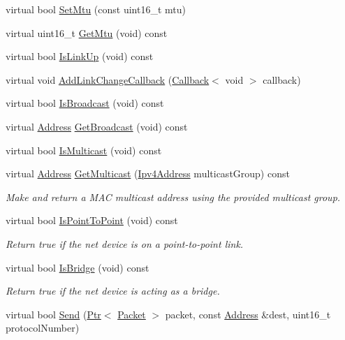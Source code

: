 \begin{DoxyCompactItemize}
\item 
virtual bool \hyperlink{classns3_1_1FdNetDevice_a7f1ac465e2a943f0369c99bd3525bb00}{Set\+Mtu} (const uint16\+\_\+t mtu)
\item 
virtual uint16\+\_\+t \hyperlink{classns3_1_1FdNetDevice_ac1d86a7d43dc3c27bccb8e06b6779f6c}{Get\+Mtu} (void) const 
\item 
virtual bool \hyperlink{classns3_1_1FdNetDevice_afe7a9225c43079850621ff0af3dc50c9}{Is\+Link\+Up} (void) const 
\item 
virtual void \hyperlink{classns3_1_1FdNetDevice_a997b2f4def41dafb904ccdb11b19b51d}{Add\+Link\+Change\+Callback} (\hyperlink{classns3_1_1Callback}{Callback}$<$ void $>$ callback)
\item 
virtual bool \hyperlink{classns3_1_1FdNetDevice_a0d582586009e076369fc8dc60f125452}{Is\+Broadcast} (void) const 
\item 
virtual \hyperlink{classns3_1_1Address}{Address} \hyperlink{classns3_1_1FdNetDevice_ada7d26e95bb6f320bacb1677c75f7484}{Get\+Broadcast} (void) const 
\item 
virtual bool \hyperlink{classns3_1_1FdNetDevice_aa0ab9a8b2aa654ac8462721081548e83}{Is\+Multicast} (void) const 
\item 
virtual \hyperlink{classns3_1_1Address}{Address} \hyperlink{classns3_1_1FdNetDevice_ac717e2565f3ca7ea35ff4ac0d05e9e78}{Get\+Multicast} (\hyperlink{classns3_1_1Ipv4Address}{Ipv4\+Address} multicast\+Group) const 
\begin{DoxyCompactList}\small\item\em Make and return a M\+AC multicast address using the provided multicast group. \end{DoxyCompactList}\item 
virtual bool \hyperlink{classns3_1_1FdNetDevice_adc2e71a7a047107567676d5fd604016f}{Is\+Point\+To\+Point} (void) const 
\begin{DoxyCompactList}\small\item\em Return true if the net device is on a point-\/to-\/point link. \end{DoxyCompactList}\item 
virtual bool \hyperlink{classns3_1_1FdNetDevice_a23c9c76044490449abd1ec8f1d500072}{Is\+Bridge} (void) const 
\begin{DoxyCompactList}\small\item\em Return true if the net device is acting as a bridge. \end{DoxyCompactList}\item 
virtual bool \hyperlink{classns3_1_1FdNetDevice_aa6a59de8f1c4586446d8d59213f60619}{Send} (\hyperlink{classns3_1_1Ptr}{Ptr}$<$ \hyperlink{classns3_1_1Packet}{Packet} $>$ packet, const \hyperlink{classns3_1_1Address}{Address} \&dest, uint16\+\_\+t protocol\+Number)

\end{DoxyCompactItemize}
